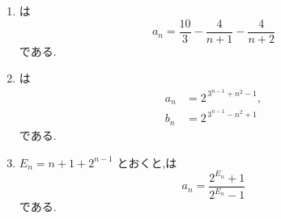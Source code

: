 \begin{enumerate}[label=\textbf{問\arabic*.},leftmargin=3.8em,format=\bookitemlink{practice-advanced}{answer}{problem}]
          \item {}は
                \[
                  a_n
                   =\frac{10}{3}-\frac4{n+1}-\frac4{n+2}
                \]
                である.
          \item {}は
                \begin{align*}
                 a_n&=2^{\,3^{n-1}+n^2-1},\\
                 b_n&=2^{\,3^{n-1}-n^2+1}
                \end{align*}
                である.
          \item $\displaystyle E_n=n+1+2^{n-1}$ とおくと,は
                \[
                  a_n=\frac{2^{E_n}+1}{2^{E_n}-1}
                \]
                である.
        \end{enumerate}


